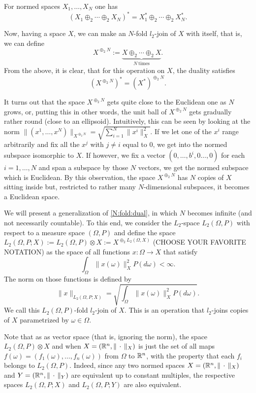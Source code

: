 \begin{cor}
	For normed spaces $X_1,\ldots,X_N$ one has 
	\[
		(X_1 \oplus_2 \cdots \oplus_2 X_N)^\ast = X_1^\ast \oplus_2 \cdots \oplus_2 X_N^\ast. 
	\]
\end{cor} 

Now, having a space $X$, we can make an $N$-fold $l_2$-join of $X$ with itself, that is, we can define 
\[	  X^{\oplus_2 N} := \underbrace{X \oplus_2 \cdots \oplus_2 X}_{N \ \text{times}}.
\] 
From the above, it is clear, that for this operation on $X$, the duality satisfies 
\begin{equation} \label{N:fold:dual} 
	(X^{\oplus_2 N})^\ast = {(X^\ast)}^{\oplus_2 N}. 
\end{equation}

\begin{rem} 
It turns out that the space $X^{\oplus_2 N}$ gets quite close to the Euclidean one as $N$ grows, or, putting this in other words, the unit ball of $X^{\oplus_2 N}$ gets gradually rather round (close to an ellipsoid). Intuitively, this can be seen by looking at the norm $\| (x^1,\ldots,x^N)\|_{X^{\oplus_2 N}} = \sqrt{ \sum_{i=1}^N \| x^i\|_X^2 }$. If we let one of the $x^i$ range arbitrarily and fix all the $x^j$ with $j \ne i$ equal to $0$, we get into the normed subspace isomorphic  to $X$. If however, we fix a vector $(0,\ldots,b^i,0\ldots,0)$ for each $i=1,\ldots, N$ and span a subspace by those $N$ vectors, we get the normed subspace which is Euclidean. By this observation, the space $X^{\oplus_2 N}$ has $N$ copies of $X$ sitting inside but, restricted to rather many $N$-dimensional subspaces, it becomes a Euclidean space. 
\end{rem} 

We will present a generalization of \eqref{N:fold:dual}, in which $N$ becomes infinite (and not necessarily countable). To this end, we consider the $L_2$-space $L_2(\Omega,P)$ with respect to a measure space $(\Omega,P)$ and define the space $L_2(\Omega,P;X) := L_2(\Omega,P) \otimes X := X^{\oplus_2 L_2(\Omega, X)}$ (CHOOSE YOUR FAVORITE NOTATION) as the space of all functions $ x : \Omega \to X$ that satisfy 
\[
	\int_{\Omega} \|x(\omega)\|_X^2 P(d \omega) < \infty.
\] The norm on those functions is defined by 
\[
	\|x\|_{L_2(\Omega,P;X)} = \sqrt{ \int_{\Omega} \|x(\omega) \|_X^2 P (d \omega)}. 
\]
We call this $L_2(\Omega,P)$-fold $l_2$-join of $X$. This is an operation that $l_2$-joins copies of $X$ parametrized by $\omega \in \Omega$. 

\begin{rem} 
Note that as as  vector space (that is, ignoring the norm), the space $L_2(\Omega,P) \otimes X$ and  when $X = (\mathbb{R}^n, \| \, \cdot \, \|_X)$ is just the set of all maps $f(\omega) = (f_1(\omega), \ldots,f_n(\omega))$ from $\Omega$ to $\mathbb{R}^n$, with the property that each $f_i$ belongs to $L_2(\Omega,P)$. Indeed, since any two normed spaces $X = (\mathbb{R}^n, \| \, \cdot \, \|_X)$ and $Y = (\mathbb{R}^n, \| \, \cdot \, \|_Y)$  are equivalent up to constant multiples, the respective spaces $L_2(\Omega, P; X)$ and $L_2(\Omega, P; Y)$ are also equivalent. 
\end{rem} 

